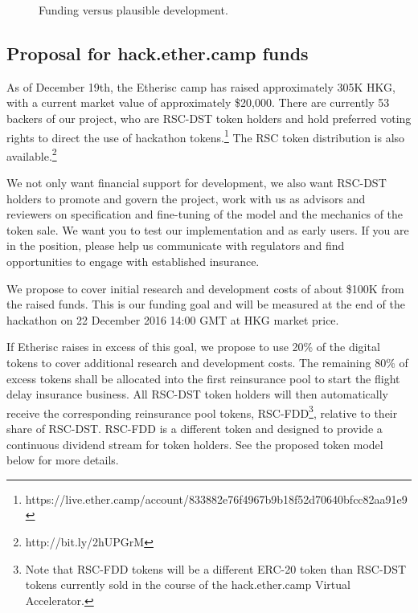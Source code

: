 \documentclass[12pt]{article}
\begin{document}
\begin{center}
\begin{figure}[H]
\begin{calstable}
\brow 
\erow

\brow 
    \cell{}
\erow
\end{calstable}
    \caption{\footnotesize Funding versus plausible development.}\label{fig1}
\end{figure}

\end{center}



\subsection{Proposal for hack.ether.camp funds}

As of December 19th, the Etherisc camp has raised approximately 305K HKG, with a current market value of approximately \$20,000. There are currently 53 backers of our project, who are RSC-DST token holders and hold preferred voting rights to direct the use of hackathon tokens.\footnote{https://live.ether.camp/account/833882e76f4967b9b18f52d70640bfcc82aa91e9} The RSC token distribution is also available.\footnote{http://bit.ly/2hUPGrM}


We not only want financial support for development, we also want RSC-DST holders to promote and govern the project, work with us as advisors and reviewers on specification and fine-tuning of the model and the mechanics of the token sale. We want you to test our implementation and as early users. If you are in the position, please help us communicate with regulators and find opportunities to engage with established insurance.

We propose to cover initial research and development costs of about \$100K from the raised funds. This is our funding goal and will be measured at the end of the hackathon on 22 December 2016 14:00 GMT at HKG market price.

If Etherisc raises in excess of this goal, we propose to use 20\% of the digital tokens to cover additional research and development costs. The remaining 80\% of excess tokens shall be allocated into the first reinsurance pool to start the flight delay insurance business. All RSC-DST token holders will then automatically receive the corresponding reinsurance pool tokens, RSC-FDD\footnote{Note that RSC-FDD tokens will be a different ERC-20 token than RSC-DST tokens currently sold in the course of the hack.ether.camp Virtual Accelerator.}, relative to their share of RSC-DST. RSC-FDD is a different token and designed to provide a continuous dividend stream for token holders. See the proposed token model below for more details.
\end{document}
